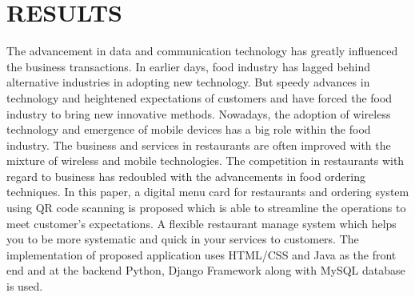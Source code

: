 \documentclass[12pt,a4paper]{report}
\begin{document}
\chapter{RESULTS}
\hspace{0.25cm}
\par
The advancement in data and communication technology has greatly influenced the
business transactions. In earlier days, food industry has lagged behind alternative industries in
adopting new technology. But speedy advances in technology and heightened expectations of
customers and have forced the food industry to bring new innovative methods. Nowadays, the
adoption of wireless technology and emergence of mobile devices has a big role within the food
industry. The business and services in restaurants are often improved with the mixture of wireless
and mobile technologies. The competition in restaurants with regard to business has redoubled
with the advancements in food ordering techniques. In this paper, a digital menu card for
restaurants and ordering system using QR code scanning is proposed which is able to streamline
the operations to meet customer’s expectations. A flexible restaurant manage system which helps
you to be more systematic and quick in your services to customers. The implementation of
proposed application uses HTML/CSS and Java as the front end and at the backend
Python, Django Framework along with MySQL database is used.
\end{document}
